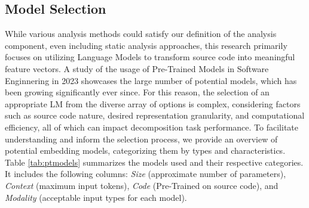 \subsection{Model Selection}\label{subsec:mselection}





While various analysis methods could satisfy our definition of the analysis component, even including static analysis approaches, this research primarily focuses on utilizing Language Models to transform source code into meaningful feature vectors. A study of the usage of Pre-Trained Models \cite{niu2023codeembedreview} in Software Enginnering in 2023 showcases the large number of potential models, which has been growing significantly ever since. For this reason, the selection of an appropriate LM from the diverse array of options is complex, considering factors such as source code nature, desired representation granularity, and computational efficiency, all of which can impact decomposition task performance. To facilitate understanding and inform the selection process, we provide an overview of potential embedding models, categorizing them by types and characteristics. Table \ref{tab:ptmodels} summarizes the models used and their respective categories. It includes the following columns: \textit{Size} (approximate number of parameters), \textit{Context} (maximum input tokens), \textit{Code} (Pre-Trained on source code), and \textit{Modality} (acceptable input types for each model).




